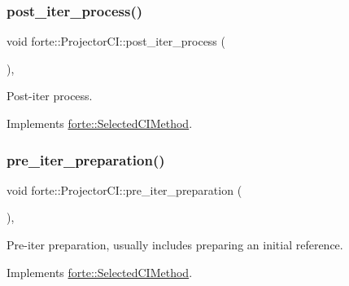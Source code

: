 \subsubsection{\texorpdfstring{post\+\_\+iter\+\_\+process()}{post\_iter\_process()}}
{\footnotesize\ttfamily void forte\+::\+Projector\+C\+I\+::post\+\_\+iter\+\_\+process (\begin{DoxyParamCaption}{ }\end{DoxyParamCaption})\hspace{0.3cm}{\ttfamily [override]}, {\ttfamily [virtual]}}



Post-\/iter process. 



Implements \mbox{\hyperlink{classforte_1_1_selected_c_i_method_a23ea3389ac1c62dee811decc5bea507f}{forte\+::\+Selected\+C\+I\+Method}}.

\mbox{\label{classforte_1_1_projector_c_i_a40fddd83a1450b2553f8347f82affca7}} 
\subsubsection{\texorpdfstring{pre\+\_\+iter\+\_\+preparation()}{pre\_iter\_preparation()}}
{\footnotesize\ttfamily void forte\+::\+Projector\+C\+I\+::pre\+\_\+iter\+\_\+preparation (\begin{DoxyParamCaption}{ }\end{DoxyParamCaption})\hspace{0.3cm}{\ttfamily [override]}, {\ttfamily [virtual]}}



Pre-\/iter preparation, usually includes preparing an initial reference. 



Implements \mbox{\hyperlink{classforte_1_1_selected_c_i_method_af92b210415034874fcf2faac8b00eca9}{forte\+::\+Selected\+C\+I\+Method}}.

\mbox{\label{classforte_1_1_projector_c_i_a9ef4c662c6582ba4ec1a9ab9bd806b6e}} 
